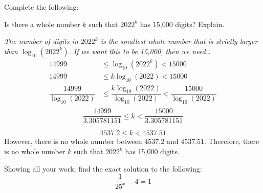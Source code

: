 \documentclass[12pt,letterpaper]{exam}
\begin{document}
\begin{questions}
\newpage
\question Complete the following:




\newpage
\question[10] Is there a whole number $k$ such that $2022^k$ has 15,000 digits? Explain. \pvspace{1.5cm}

{\itshape The number of digits in $2022^k$ is the smallest whole number that is strictly larger than $\log_{10}(2022^k)$. If we want this to be 15,000, then we need\dots \pspace
	\[
	\begin{aligned}
	14999 &\leq \log_{10}(2022^k) < 15000 \\[0.5cm]
	14999 &\leq k \log_{10}(2022) < 15000 \\[0.5cm]
	\dfrac{14999}{\log_{10}(2022)} &\leq \dfrac{k \log_{10}(2022)}{\log_{10}(2022)} < \dfrac{15000}{\log_{10}(2022)} \\[0.5cm]
	\end{aligned}
	\]
	\[
	\dfrac{14999}{3.305781151} \leq  k < \dfrac{15000}{3.305781151}
	\] \par
	\[
	4537.2 \leq k < 4537.51
	\] \pspace
However, there is no whole number between $4537.2$ and $4537.51$. Therefore, there is no whole number $k$ such that $2022^k$ has 15,000 digits.}



\newpage
\question[10] Showing all your work, find the exact solution to the following: 
	\[
	\dfrac{1}{25^x} - 4= 1
	\] \pvspace{1.3cm}
	

\end{questions}
\end{document}
